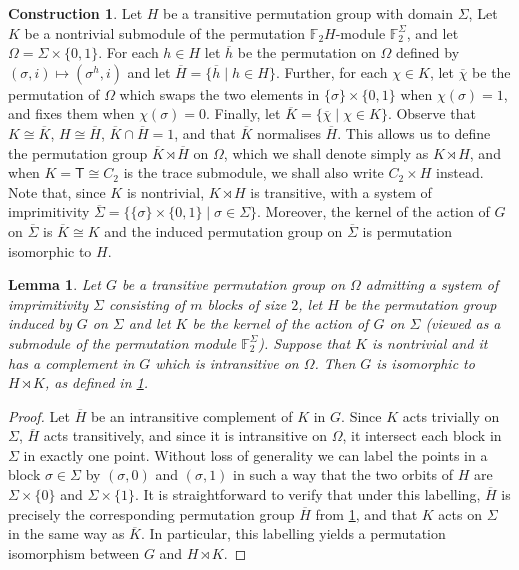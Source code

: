 \documentclass[a4paper]{amsart}
\newcommand{\FF}{\mathbb{F}}
\newtheorem{lemma}[theorem]{Lemma}
\theoremstyle{definition}
\newtheorem{construction}[theorem]{Construction}
\begin{document}
\begin{construction} \label{constr:semidirect}
    Let $H$ be a transitive permutation group with domain $\Sigma$, Let $K$ be a nontrivial submodule of the permutation $\FF_2H$-module $\FF_2^\Sigma$, and let $\Omega = \Sigma \times \{0,1\}$. For each $h \in H$ let $\overline{h}$ be the permutation on $\Omega$ defined by $(\sigma, i) \mapsto (\sigma^h, i)$ and let $\overline{H} = \{\overline{h} \mid h \in H\}$. Further, for each $\chi \in K$, let $\overline{\chi}$ be the permutation of $\Omega$ which swaps the two elements in $\{ \sigma \} \times \{0,1\}$ when $\chi(\sigma) = 1$, and fixes them when $\chi(\sigma) = 0$. Finally, let $\overline{K} = \{\overline{\chi} \mid \chi \in K\}$. Observe that $K \cong \overline{K}$, $H \cong \overline{H}$, $\overline{K} \cap \overline{H} = 1$, and that $\overline{K}$ normalises $\overline{H}$.
    This allows us to define the permutation group $\overline{K} \rtimes \overline{H}$ on $\Omega$, which we shall denote simply as $K \rtimes H$, and when $K=\mathsf{T}\cong C_2$ is the trace submodule,
    we shall also write $C_2\times H$ instead. Note that, since $K$ is nontrivial, $K \rtimes H$ is transitive, with a system of imprimitivity $\overline{\Sigma} = \{\{\sigma\} \times \{0,1\} \mid \sigma \in \Sigma\}$. Moreover, the kernel of the action of $G$ on $\overline{\Sigma}$ is $\overline{K} \cong K$ and the induced permutation group on $\overline{\Sigma}$ is permutation isomorphic to $H$.
\end{construction} 

\begin{lemma}
     \label{lem:semidir}
     Let $G$ be a transitive permutation group on $\Omega$ admitting a system of imprimitivity $\Sigma$ consisting of $m$ blocks of size $2$, let $H$ be the permutation group induced by $G$ on $\Sigma$ and let $K$ be the kernel of the action of $G$ on $\Sigma$ (viewed as a submodule of the permutation module $\FF_2^\Sigma$). Suppose that $K$ is nontrivial and it has a complement in $G$ which is intransitive on $\Omega$. Then $G$ is isomorphic to $H \rtimes K$, as defined in \cref{constr:semidirect}.
\end{lemma}

\begin{proof}
    Let $\overline{H}$ be an intransitive complement of $K$ in $G$. Since $K$ acts trivially on $\Sigma$, $\overline{H}$ acts transitively, and since it is intransitive on $\Omega$, it intersect each block in $\Sigma$ in exactly one point. Without loss of generality we can label the points in a block $\sigma \in \Sigma$ by $(\sigma ,0)$ and $(\sigma, 1)$ in such a way that the two orbits of $H$ are $\Sigma \times \{0\}$ and $\Sigma \times \{1\}$. It is straightforward to verify that under this labelling, $\overline{H}$ is precisely the corresponding permutation group $\overline{H}$ from \cref{constr:semidirect}, and that $K$ acts on $\Sigma$ in the same way as $\overline{K}$. In particular, this labelling yields a permutation isomorphism between $G$ and $H \rtimes K$.
\end{proof}
\end{document}
